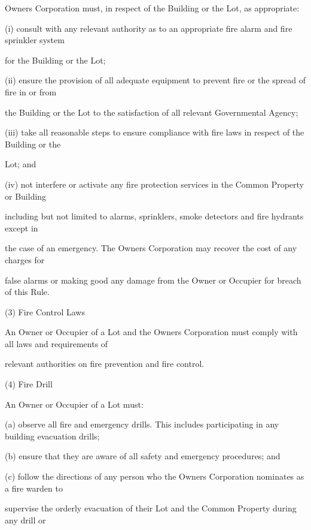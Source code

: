 \documentclass{article}
\begin{document}
{\fontsize{10.02}{1}Owners Corporation must, in respect of the Building or the Lot, as appropriate: }

{\fontsize{9.962}{1}(i) consult with any relevant authority as to an appropriate fire alarm and fire sprinkler system }

{\fontsize{10.02}{1}for the Building or the Lot; }

{\fontsize{9.962}{1}(ii) ensure the provision of all adequate equipment to prevent fire or the spread of fire in or from }

{\fontsize{10.02}{1}the Building or the Lot to the satisfaction of all relevant Governmental Agency; }

{\fontsize{9.962}{1}(iii) take all reasonable steps to ensure compliance with fire laws in respect of the Building or the }

{\fontsize{10.02}{1}Lot; and }

{\fontsize{9.962}{1}(iv) not interfere or activate any fire protection services in the Common Property or Building }

{\fontsize{10.02}{1}including but not limited to alarms, sprinklers, smoke detectors and fire hydrants except in }

{\fontsize{10.02}{1}the case of an emergency. The Owners Corporation may recover the cost of any charges for }

{\fontsize{10.02}{1}false alarms or making good any damage from the Owner or Occupier for breach of this Rule. }

{\fontsize{9.962}{1}(3) Fire Control Laws }

{\fontsize{10.02}{1}An Owner or Occupier of a Lot and the Owners Corporation must comply with all laws and requirements of }

{\fontsize{10.02}{1}relevant authorities on fire prevention and fire control. }

{\fontsize{9.962}{1}(4) Fire Drill }

{\fontsize{10.02}{1}An Owner or Occupier of a Lot must: }

{\fontsize{9.962}{1}(a) observe all fire and emergency drills. This includes participating in any building evacuation drills; }

{\fontsize{9.962}{1}(b) ensure that they are aware of all safety and emergency procedures; and }

{\fontsize{9.962}{1}(c) follow the directions of any person who the Owners Corporation nominates as a fire warden to }

{\fontsize{10.02}{1}supervise the orderly evacuation of their Lot and the Common Property during any drill or }
\end{document}
